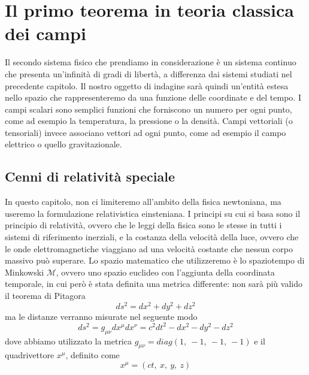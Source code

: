 \chapter{Il primo teorema in teoria classica dei campi}

    Il secondo sistema fisico che prendiamo in considerazione è un sistema continuo che presenta un'infinità di gradi di libertà, a differenza dai sistemi studiati nel precedente capitolo. Il nostro oggetto di indagine sarà quindi un'entità estesa nello spazio che rappresenteremo da una funzione delle coordinate e del tempo. I campi scalari sono semplici funzioni che forniscono un numero per ogni punto, come ad esempio la temperatura, la pressione o la densità. Campi vettoriali (o tensoriali) invece associano vettori ad ogni punto, come ad esempio il campo elettrico o quello gravitazionale.

\section{Cenni di relatività speciale}
    In questo capitolo, non ci limiteremo all'ambito della fisica newtoniana, ma useremo la formulazione relativistica einsteniana. I principi su cui si basa sono il principio di relatività, ovvero che le leggi della fisica sono le stesse in tutti i sistemi di riferimento inerziali, e la costanza della velocità della luce, ovvero che le onde elettromagnetiche viaggiano ad una velocità costante che nessun corpo massivo può superare. Lo spazio matematico che utilizzeremo è lo spaziotempo di Minkowski $\mathcal M$, ovvero uno spazio euclideo con l'aggiunta della coordinata temporale, in cui però è stata definita una metrica differente: non sarà più valido il teorema di Pitagora 
    \begin{equation*}
        ds^2 = dx^2 + dy^2 + dz^2
    \end{equation*}
    ma le distanze verranno misurate nel seguente modo
    \begin{equation*}
        ds^2 = g_{\mu\nu} dx^\mu dx^\nu = c^2 dt^2 - dx^2 - dy^2 - dz^2
    \end{equation*}
    dove abbiamo utilizzato la metrica $g_{\mu\nu} = diag(1,~-1,~-1,~-1)$ e il quadrivettore $x^\mu$, definito come 
    \begin{equation*}
        x^\mu = (ct,~x,~y,~z)
    \end{equation*}
    
